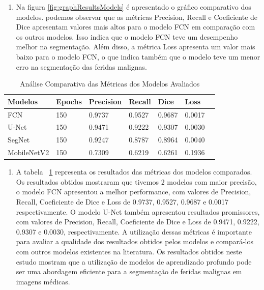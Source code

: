      \begin{enumerate}
        \item Na figura \ref{fig:graphResultsModels} é apresentado o gráfico comparativo dos modelos. podemos observar que as métricas Precision, Recall e Coeficiente de Dice apresentam valores mais altos para o modelo \ac{FCN} em comparação com os outros modelos. Isso indica que o modelo \ac{FCN} teve um desempenho melhor na segmentação. Além disso, a métrica Loss apresenta um valor mais baixo para o modelo \ac{FCN}, o que indica também que o modelo teve um menor erro na segmentação das feridas malignas.
    \end{enumerate}
    
    \begin{table}[htbp]
        \centering
        \begin{tabular}{|l|l|l|l|l|l|l|}
            \hline
            Modelos   & Epochs & Precision & Recall  & Dice    & Loss      \\ \hline
            \ac{FCN}       &  150   & 0.9737    & 0.9527  & 0.9687  & 0.0017    \\ \hline
            \ac{U-Net}     &  150   & 0.9471    & 0.9222  & 0.9307  & 0.0030    \\ \hline
            \ac{SegNet}    &  150   & 0.9247    & 0.8787  & 0.8964  & 0.0040    \\ \hline
            \ac{MobileNetV2} &  150   & 0.7309    & 0.6219  & 0.6261  & 0.1936    \\ \hline
        \end{tabular}
        \caption{Análise Comparativa das Métricas dos Modelos Avaliados}
        \label{tab:analiseMetricas}
    \end{table}

    \begin{enumerate}
        \item A tabela ~\ref{tab:analiseMetricas} representa os resultados das métricas 
        dos modelos comparados. Os resultados obtidos mostraram que tivemos 2 modelos com maior precisão, o modelo \ac{FCN} apresentou a melhor performance, com valores de Precision, Recall, Coeficiente de Dice e Loss de 0.9737, 0.9527, 0.9687 e 0.0017 respectivamente. O modelo \ac{U-Net} também apresentou resultados promissores, com valores de Precision, Recall, Coeficiente de Dice e Loss de 0.9471, 0.9222, 0.9307 e 0.0030, respectivamente. A utilização dessas métricas é importante para avaliar a qualidade dos resultados obtidos pelos modelos e compará-los com outros modelos existentes na literatura. Os resultados obtidos neste estudo mostram que a utilização de modelos de aprendizado profundo pode ser uma abordagem eficiente para a segmentação de feridas malignas em imagens médicas. 
    \end{enumerate}
    
